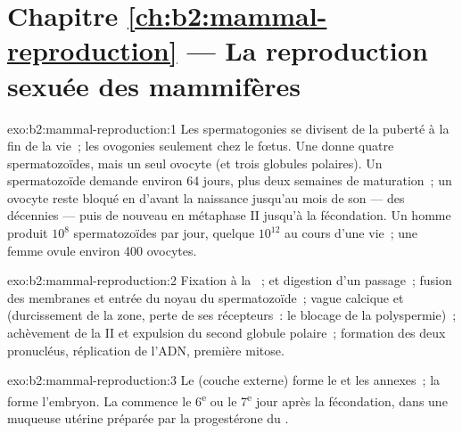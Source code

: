 \section*{Chapitre \ref{ch:b2:mammal-reproduction} --- La reproduction sexuée des mammifères}

\begin{solution}{exo:b2:mammal-reproduction:1}
Les spermatogonies se divisent de la puberté à la fin de la vie~; les
ovogonies seulement chez le fœtus. Une  donne quatre
spermatozoïdes, mais un seul ovocyte (et trois globules polaires). Un
spermatozoïde demande environ 64 jours, plus deux semaines de
maturation~; un ovocyte reste bloqué en  d'avant la naissance
jusqu'au mois de son  --- des décennies --- puis de nouveau en
métaphase II jusqu'à la fécondation. Un homme produit $10^{8}$
spermatozoïdes par jour, quelque $10^{12}$ au cours d'une vie~; une
femme ovule environ 400 ovocytes.
\end{solution}

\begin{solution}{exo:b2:mammal-reproduction:2}
Fixation à la ~;  et digestion d'un
passage~; fusion des membranes et entrée du noyau du spermatozoïde~;
vague calcique et  (durcissement de la zone, perte de
ses récepteurs~: le blocage de la polyspermie)~; achèvement de la
 II et expulsion du second globule polaire~; formation des deux
pronucléus, réplication de l'ADN, première mitose.
\end{solution}

\begin{solution}{exo:b2:mammal-reproduction:3}
Le  (couche externe) forme le  et les annexes~; la
 forme l'embryon. La  commence le
6\textsuperscript{e} ou le 7\textsuperscript{e} jour après la
fécondation, dans une muqueuse utérine préparée par la progestérone du
.
\end{solution}


